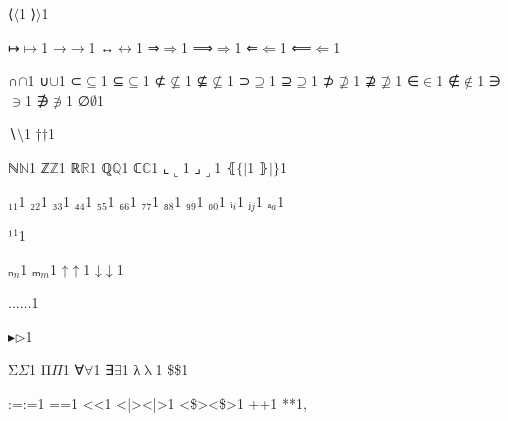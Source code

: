{%
{⟨}{{\ensuremath{\langle}}}1
{⟩}{{\ensuremath{\rangle}}}1

{↦}{{\ensuremath{\mapsto}}}1
{→}{{\ensuremath{\rightarrow}}}1
{↔}{{\ensuremath{\leftrightarrow}}}1
{⇒}{{\ensuremath{\Rightarrow}}}1
{⟹}{{\ensuremath{\Longrightarrow}}}1
{⇐}{{\ensuremath{\Leftarrow}}}1
{⟸}{{\ensuremath{\Longleftarrow}}}1

{∩}{{\ensuremath{\cap}}}1
{∪}{{\ensuremath{\cup}}}1
{⊂}{{\ensuremath{\subseteq}}}1
{⊆}{{\ensuremath{\subseteq}}}1
{⊄}{{\ensuremath{\nsubseteq}}}1
{⊈}{{\ensuremath{\nsubseteq}}}1
{⊃}{{\ensuremath{\supseteq}}}1
{⊇}{{\ensuremath{\supseteq}}}1
{⊅}{{\ensuremath{\nsupseteq}}}1
{⊉}{{\ensuremath{\nsupseteq}}}1
{∈}{{\ensuremath{\in}}}1
{∉}{{\ensuremath{\notin}}}1
{∋}{{\ensuremath{\ni}}}1
{∌}{{\ensuremath{\notni}}}1
{∅}{{\ensuremath{\emptyset}}}1

{∖}{{\ensuremath{\setminus}}}1
{†}{{\ensuremath{\dag}}}1

{ℕ}{{\ensuremath{\mathbb{N}}}}1
{ℤ}{{\ensuremath{\mathbb{Z}}}}1
{ℝ}{{\ensuremath{\mathbb{R}}}}1
{ℚ}{{\ensuremath{\mathbb{Q}}}}1
{ℂ}{{\ensuremath{\mathbb{C}}}}1
{⌞}{{\ensuremath{\llcorner}}}1
{⌟}{{\ensuremath{\lrcorner}}}1
{⦃}{{\ensuremath{\{\!|}}}1
{⦄}{{\ensuremath{|\!\}}}}1

{₁}{{\ensuremath{_1}}}1
{₂}{{\ensuremath{_2}}}1
{₃}{{\ensuremath{_3}}}1
{₄}{{\ensuremath{_4}}}1
{₅}{{\ensuremath{_5}}}1
{₆}{{\ensuremath{_6}}}1
{₇}{{\ensuremath{_7}}}1
{₈}{{\ensuremath{_8}}}1
{₉}{{\ensuremath{_9}}}1
{₀}{{\ensuremath{_0}}}1
{ᵢ}{{\ensuremath{_i}}}1
{ⱼ}{{\ensuremath{_j}}}1
{ₐ}{{\ensuremath{_a}}}1

{¹}{{\ensuremath{^1}}}1

{ₙ}{{\ensuremath{_n}}}1
{ₘ}{{\ensuremath{_m}}}1
{↑}{{\ensuremath{\uparrow}}}1
{↓}{{\ensuremath{\downarrow}}}1

{...}{{\ensuremath{\ldots}}}1

{▸}{{\ensuremath{\triangleright}}}1

{Σ}{{\color{symbolcolor}\ensuremath{\Sigma}}}1
{Π}{{\color{symbolcolor}\ensuremath{\Pi}}}1
{∀}{{\color{symbolcolor}\ensuremath{\forall}}}1
{∃}{{\color{symbolcolor}\ensuremath{\exists}}}1
{λ}{{\color{symbolcolor}\ensuremath{\mathrm{\uplambda}}}}1
{\$}{{\color{symbolcolor}\$}}1

{:=}{{\color{symbolcolor}:=}}1
{=}{{\color{symbolcolor}=}}1
{<}{{\color{symbolcolor}<}}1
{<|>}{{\color{symbolcolor}<|>}}1
{<\$>}{{\color{symbolcolor}<\$>}}1
{+}{{\color{symbolcolor}+}}1
{*}{{\color{symbolcolor}*}}1,

}
